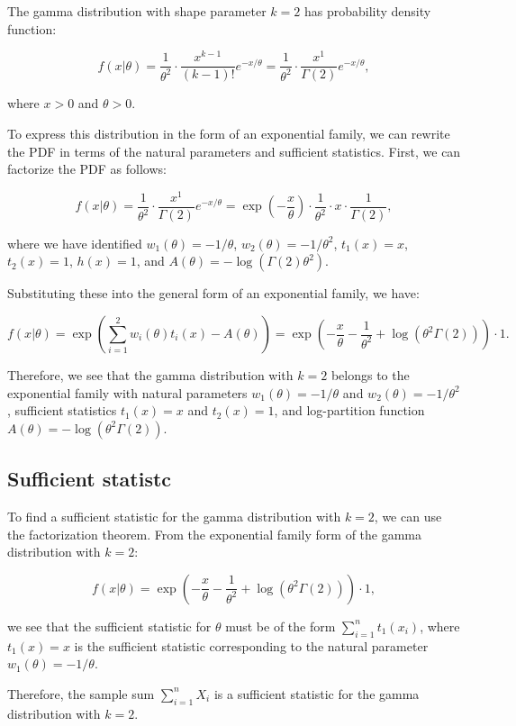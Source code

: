 \documentclass[11pt]{article}
\begin{document}
The gamma distribution with shape parameter $k=2$ has probability density function:

$$ f(x|\theta) = \frac{1}{\theta^2}\cdot \frac{x^{k-1}}{(k-1)!}e^{-x/\theta} = \frac{1}{\theta^2}\cdot \frac{x^{1}}{\Gamma(2)}e^{-x/\theta}, $$

where $x > 0$ and $\theta > 0$.

To express this distribution in the form of an exponential family, we can rewrite the PDF in terms of the natural parameters and sufficient statistics. First, we can factorize the PDF as follows:

$$ f(x|\theta) = \frac{1}{\theta^2}\cdot \frac{x^{1}}{\Gamma(2)}e^{-x/\theta} = \exp\left(-\frac{x}{\theta}\right)\cdot \frac{1}{\theta^2}\cdot x \cdot \frac{1}{\Gamma(2)}, $$

where we have identified $w_1(\theta) = -1/\theta$, $w_2(\theta) = -1/\theta^2$, $t_1(x) = x$, $t_2(x) = 1$, $h(x) = 1$, and $A(\theta) = -\log(\Gamma(2)\theta^2)$.

Substituting these into the general form of an exponential family, we have:

$$ f(x|\theta) = \exp\left(\sum_{i=1}^{2} w_i(\theta) t_i(x) - A(\theta)\right) = \exp\left(-\frac{x}{\theta} -\frac{1}{\theta^2} + \log(\theta^2\Gamma(2))\right) \cdot 1. $$

Therefore, we see that the gamma distribution with $k=2$ belongs to the exponential family with natural parameters $w_1(\theta)=-1/\theta$ and $w_2(\theta)=-1/\theta^2$, sufficient statistics $t_1(x)=x$ and $t_2(x)=1$, and log-partition function $A(\theta)=-\log(\theta^2\Gamma(2))$.

\subsection*{Sufficient statistc}
To find a sufficient statistic for the gamma distribution with $k=2$, we can use the factorization theorem. From the exponential family form of the gamma distribution with $k=2$:

$$ f(x|\theta) = \exp\left(-\frac{x}{\theta} -\frac{1}{\theta^2} + \log(\theta^2\Gamma(2))\right) \cdot 1, $$

we see that the sufficient statistic for $\theta$ must be of the form $\sum_{i=1}^{n} t_1(x_i)$, where $t_1(x) = x$ is the sufficient statistic corresponding to the natural parameter $w_1(\theta)=-1/\theta$.

Therefore, the sample sum $\sum_{i=1}^{n} X_i$ is a sufficient statistic for the gamma distribution with $k=2$.
\end{document}
